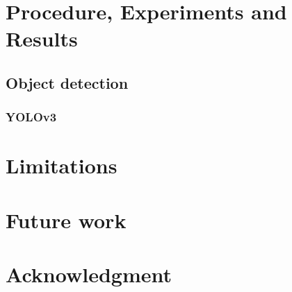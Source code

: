 \documentclass[conference]{IEEEtran}
\begin{document}
\section{Procedure, Experiments and Results}
\subsection{Object detection}
\subsubsection{YOLOv3}




\section{Limitations}

\section{Future work}

\section{Acknowledgment}



\end{document}
